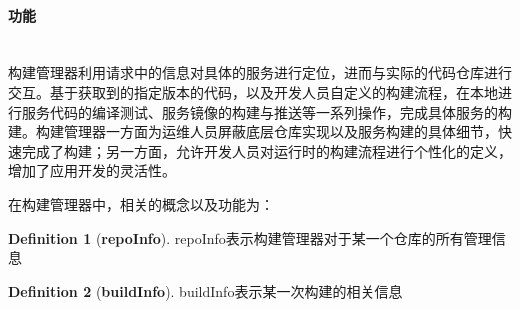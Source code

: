 \documentclass[a4paper, 12pt]{article}
\theoremstyle{definition}
\newtheorem{definition}{Definition}[section]
\begin{document}
\paragraph{功能}\mbox{}\\

构建管理器利用请求中的信息对具体的服务进行定位，进而与实际的代码仓库进行交互。基于获取到的指定版本的代码，以及开发人员自定义的构建流程，在本地进行服务代码的编译测试、服务镜像的构建与推送等一系列操作，完成具体服务的构建。构建管理器一方面为运维人员屏蔽底层仓库实现以及服务构建的具体细节，快速完成了构建；另一方面，允许开发人员对运行时的构建流程进行个性化的定义，增加了应用开发的灵活性。

在构建管理器中，相关的概念以及功能为：
\theoremstyle{definition}
\begin{definition}[\textbf{repoInfo}]
\label{definition:repoInfo}
repoInfo表示构建管理器对于某一个仓库的所有管理信息
\end{definition}

\theoremstyle{definition}
\begin{definition}[\textbf{buildInfo}]
\label{definition:buildInfo}
buildInfo表示某一次构建的相关信息
\end{definition}
\end{document}
